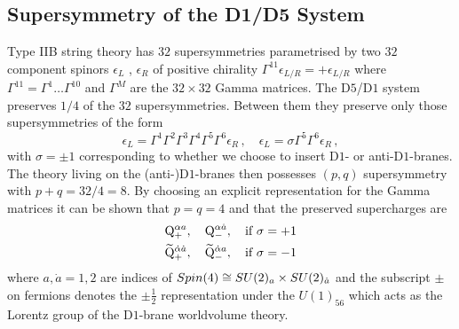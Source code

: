 \documentclass[main.tex]{subfiles}
\begin{document}
\subsection{Supersymmetry of the D1/D5 System}
Type IIB string theory has $32$ supersymmetries parametrised by two $32$ component spinors $\epsilon_L$ , $\epsilon_R$ of positive chirality $\Gamma^{11}\mathcal{\epsilon}_{L/R}=+\mathcal{\epsilon}_{L/R}$ where $\Gamma^{11}=\Gamma^1\dots\Gamma^{10}$ and $\Gamma^M$ are the $32\times32$ Gamma matrices.
The D$5$/D$1$ system preserves $1/4$ of the $32$ supersymmetries. Between them they preserve only those supersymmetries of the form
\begin{equation}
\epsilon_L=\Gamma^1\Gamma^2\Gamma^3\Gamma^4\Gamma^5\Gamma^6\epsilon_R\,,\quad \epsilon_L=\sigma\Gamma^5\Gamma^6\epsilon_R\,,
\end{equation} 
with $\sigma=\pm1$ corresponding to whether we choose to insert D$1$- or anti-D$1$-branes. The theory living on the (anti-)D$1$-branes then possesses $(p,q)$ supersymmetry with $p+q=32/4=8$. By choosing an explicit representation for the Gamma matrices it can be shown that $p=q=4$ and that the preserved supercharges are 
\begin{align}
&\mathrm{Q}^{\alpha a}_{+},\quad \mathrm{Q}^{\alpha \dot a}_{-},\quad \text{if $\sigma=+1$}\\
&\widetilde{\mathrm{Q}}^{\dot\alpha\dot a}_{+},\quad\widetilde{\mathrm{Q}}^{\dot\alpha a}_{-},\quad \text{if $\sigma=-1$}
\end{align}
where $a,\dot a=1,2$ are indices of $Spin(4)\cong SU(2)_{a}\times SU(2)_{\dot a}$ and the subscript $\pm$ on fermions denotes the $\pm\frac{1}{2}$ representation under the $U(1)_{56}$ which acts as the Lorentz group of the D$1$-brane worldvolume theory.
\end{document}
